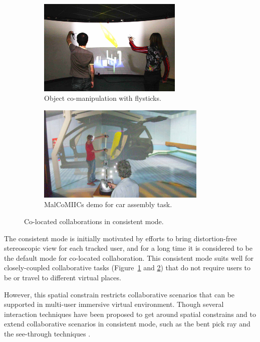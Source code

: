 \begin{figure}[htb]
\begin{subfigure}{.45\textwidth}
    \centering
    \includegraphics[height=4.6cm]{figures/ch2/comanip}
    \caption{Object co-manipulation with flysticks.}
    \label{fig:2_consistent_collab:comanip}
  \end{subfigure}
  \begin{subfigure}{.55\textwidth}
    \centering
    \includegraphics[height=4.6cm]{figures/ch2/malcomiics}
    \caption{MalCoMIICs demo for car assembly task.}
    \label{fig:2_consistent_collab:malcomiics}
  \end{subfigure}
  \caption{\label{fig:2_consistent_collab}Co-located collaborations in consistent mode.}
\end{figure}

The consistent mode is initially motivated by efforts to bring distortion-free stereoscopic view for each tracked user, and for a long time it is considered to be the default mode for co-located collaboration. This consistent mode suits well for closely-coupled collaborative tasks \citep{Simon2005First, Aguerreche2010Comparison, Martin2011Reconfigurable} (Figure~\ref{fig:2_consistent_collab:comanip} and \ref{fig:2_consistent_collab:malcomiics}) that do not require users to be or travel to different virtual places.

However, this spatial constrain restricts collaborative scenarios that can be supported in multi-user immersive virtual environment. Though several interaction techniques have been proposed to get around spatial constrains and to extend collaborative scenarios in consistent mode, such as the bent pick ray \citep{Riege2006Bent} and the see-through techniques \citep{Argelaguet2010STT}.


